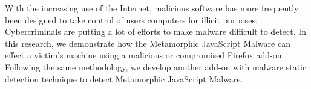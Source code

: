 With the increasing use of the Internet, malicious software has more frequently been designed to take control of users computers for illicit purposes. Cybercriminals are putting a lot of efforts to make malware difficult to detect. In this research, we demonstrate how the Metamorphic JavaScript Malware can effect a victim's machine using a malicious or compromised Firefox add-on. Following the same methodology, we develop another add-on with malware static detection technique to detect Metamorphic JavaScript Malware.